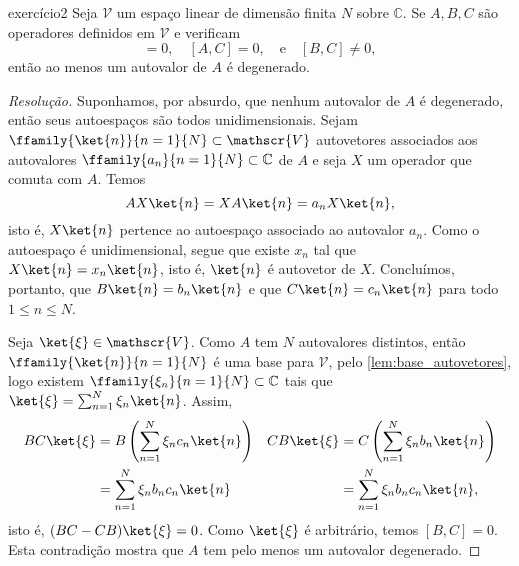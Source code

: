 \begin{exercício}{}{exercício2}
    Seja \(\mathscr{V}\) um espaço linear de dimensão finita \(N\) sobre \(\mathbb{C}\). Se \(A, B, C\) são operadores definidos em \(\mathscr{V}\) e verificam
    \begin{equation*}
        [A,B] = 0,\quad
        [A,C] = 0,\quad\text{e}\quad
        [B,C] \neq 0,
    \end{equation*}
    então ao menos um autovalor de \(A\) é degenerado.
\end{exercício}
\begin{proof}[Resolução]
    Suponhamos, por absurdo, que nenhum autovalor de \(A\) é degenerado, então seus autoespaços são todos unidimensionais. Sejam \(\ffamily{\ket{n}}{n=1}{N}\subset \mathscr{V}\) autovetores associados aos autovalores \(\ffamily{a_n}{n=1}{N}\subset \mathbb{C}\) de \(A\) e seja \(X\) um operador que comuta com \(A\). Temos
    \begin{equation*}
        AX\ket{n} = XA\ket{n} = a_n X\ket{n},
    \end{equation*}
    isto é, \(X \ket{n}\) pertence ao autoespaço associado ao autovalor \(a_n\). Como o autoespaço é unidimensional, segue que existe \(x_n\) tal que \(X\ket{n} = x_n \ket{n}\), isto é, \(\ket{n}\) é autovetor de \(X\). Concluímos, portanto, que \(B \ket{n} = b_n \ket{n}\) e que \(C \ket{n} = c_n \ket{n}\) para todo \(1 \leq n \leq N\).

    Seja \(\ket{\xi} \in \mathscr{V}\). Como \(A\) tem \(N\) autovalores distintos, então \(\ffamily{\ket{n}}{n=1}{N}\) é uma base para \(\mathscr{V}\), pelo \cref{lem:base_autovetores}, logo existem \(\ffamily{\xi_n}{n=1}{N} \subset \mathbb{C}\) tais que \(\ket{\xi} = \sum_{n = 1}^N \xi_n \ket{n}\). Assim,
    \begin{align*}
        BC\ket{\xi} &= B \left(\sum_{n = 1}^N \xi_n c_n \ket{n}\right)&
        CB\ket{\xi} &= C \left(\sum_{n=1}^N \xi_n b_n \ket{n}\right)\\
                    &= \sum_{n=1}^N \xi_n b_n c_n \ket{n}&
                    &= \sum_{n=1}^N \xi_n b_n c_n \ket{n},
    \end{align*}
    isto é, \((BC - CB)\ket{\xi} = 0\). Como \(\ket{\xi}\) é arbitrário, temos \([B,C] = 0\). Esta contradição mostra que \(A\) tem pelo menos um autovalor degenerado.
\end{proof}
